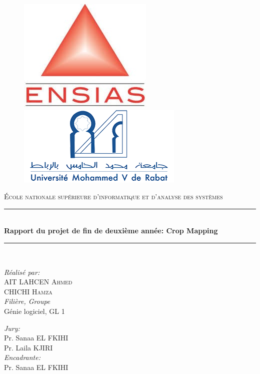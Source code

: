 \documentclass[12pt, openany]{report}
\newcommand{\HRule}{\rule{\linewidth}{0.5mm}}
\begin{document}
\begin{titlepage}
  \begin{sffamily}
  \begin{center}

	\begin{figure}[t]
	   \begin{minipage}{0.48\textwidth } 
	     \includegraphics[width=.3\linewidth , left]{ensias.JPG}
	   \end{minipage}\hfill
	   \begin{minipage}{0.48\textwidth }
	     \includegraphics[width=.4\linewidth , right]{univesite.JPG}
	   \end{minipage}
	\end{figure}
     
    \textsc{\LARGE École nationale supérieure d'informatique et d'analyse des systèmes}\\[4cm]


    \HRule \\[0.5cm]
    { \huge \bfseries Rapport du projet de fin de deuxième année: Crop Mapping\\[0.4cm] }
	\HRule\\[4cm]

    \begin{minipage}{0.45\textwidth}
      \begin{flushleft} \large
        \emph{Réalisé par:}\\
            AIT LAHCEN \textsc{Ahmed}\\
	        CHICHI \textsc{Hamza}\\
       \emph{Filière, Groupe}\\
	        Génie logiciel, GL 1\\
      \end{flushleft}
    \end{minipage}
    \begin{minipage}{0.3\textwidth}
      \begin{flushright} \large
      \begin{flushleft}
       \emph{Jury:}\\
	Pr. Sanaa \textsc{EL FKIHI}\\
	Pr. Laila \textsc{KJIRI}\\
	\emph{Encadrante:}\\
	Pr. Sanaa \textsc{EL FKIHI}\\
	\end{flushleft}
	\end{flushright}
    \end{minipage}


\end{center}
\end{sffamily}
\end{titlepage}
\end{document}
